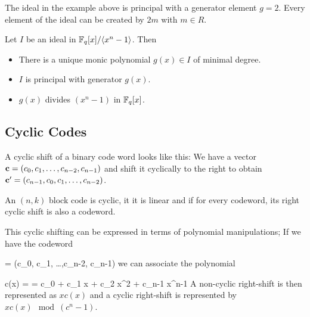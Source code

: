 The ideal in the example above is principal with a generator element $g = 2$. Every element of the ideal can be created by $2m$ with $m \in R$.

\begin{theorem}
  Let $I$ be an ideal in $\mathbb{F}_q[x] / \langle x^n-1 \rangle$. Then
  \begin{itemize}
    \item There is a unique monic polynomial $g(x) \in I$ of minimal degree.
    \item $I$ is principal with generator $g(x)$.
    \item $g(x)$ divides $(x^n-1)$ in $\mathbb{F}_q[x]$.
  \end{itemize}

\end{theorem}


\subsection{Cyclic Codes}

A cyclic shift of a binary code word looks like this: We have a vector $\mathbf{c} = (c_0, c_1, \ldots,c_{n-2}, c_{n-1})$ and shift it cyclically to the right to obtain $\mathbf{c}' = (c_{n-1}, c_0, c_1, \ldots, c_{n-2})$.

\begin{definition}
  An $(n,k)$ block code is cyclic, it it is linear and if for every codeword, its right cyclic shift is also a codeword.
\end{definition}


This cyclic shifting can be expressed in terms of polynomial manipulations; If we have the codeword

\bee
\cbf = (c_0, c_1, \ldots,c_{n-2}, c_{n-1})
\eee
%
we can associate the polynomial

\bee
c(x) = \cbf = c_0 + c_1 x + c_2 x^2 + \cdots c_{n-1} x^{n-1}
\eee
%
A non-cyclic right-shift is then represented as $xc(x)$ and a cyclic right-shift is represented by $xc(x) \mod (c^n-1)$.
